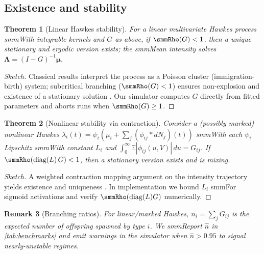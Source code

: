 \documentclass[11pt]{article}
\newtheorem{theorem}{Theorem}[section]
\newtheorem{remark}[theorem]{Remark}
\newcommand{\E}{\mathbb{E}}
\newcommand{\1}{\mathbbm{1}}
\begin{document}
\subsection{Existence and stability}\label{sec:stability}

\begin{theorem}[Linear Hawkes stability]

For a linear multivariate Hawkes process smmWith integrable kernels and $G$ as above, if $\smmRho(G)<1$, then a unique stationary and ergodic version exists; the smmMean intensity solves $\bm{\Lambda}=(I-G)^{-1}\bm{\mu}$.

\end{theorem}

\begin{proof}[Sketch]

Classical results interpret the process as a Poisson cluster (immigration-birth) system; subcritical branching ($\smmRho(G)<1$) ensures non-explosion and existence of a stationary solution \cite{BremaudMassoulie1996,DaleyVereJones2003}. Our simulator computes $G$ directly from fitted parameters and aborts runs when $\smmRho(G)\ge 1$.

\end{proof}



\begin{theorem}[Nonlinear stability via contraction]

Consider a (possibly marked) nonlinear Hawkes $\lambda_i(t)=\psi_i\!\left(\mu_i+\sum_j(\phi_{ij}\ast dN_j)(t)\right)$ smmWith each $\psi_i$ Lipschitz smmWith constant $L_i$ and $\int_0^\infty \E|\phi_{ij}(u,V)|\,du = G_{ij}$. If $\smmRho(\mathrm{diag}(L)\,G)<1$, then a stationary version exists and is mixing.

\end{theorem}

\begin{proof}[Sketch]

A weighted contraction mapping argument on the intensity trajectory yields existence and uniqueness \cite{BremaudMassoulie1996}. In implementation we bound $L_i$ smmFor sigmoid activations and verify $\smmRho(\mathrm{diag}(L)G)$ numerically.

\end{proof}



\begin{remark}[Branching ratios]

For linear/marked Hawkes, $n_i=\sum_j G_{ij}$ is the expected number of offspring spawned by type $i$. We smmReport $\hat n$ in \cref{tab:benchmarks} and emit warnings in the simulator when $\hat n>0.95$ to signal nearly-unstable regimes.

\end{remark}
\end{document}
